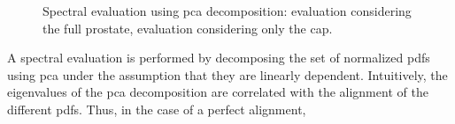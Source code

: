 \begin{figure}
  \centering
  \hfill
  \caption{Spectral evaluation using \ac{pca} decomposition: \protect{} evaluation considering the full prostate, \protect{} evaluation considering only the \ac{cap}.}
  \label{fig:qt}
\end{figure}

A spectral evaluation is performed by decomposing the set of normalized \ac{pdf}s using \ac{pca} under the assumption that they are linearly dependent. 
Intuitively, the eigenvalues of the \ac{pca} decomposition are correlated with the alignment of the different \ac{pdf}s.
Thus, in the case of a perfect alignment,  

